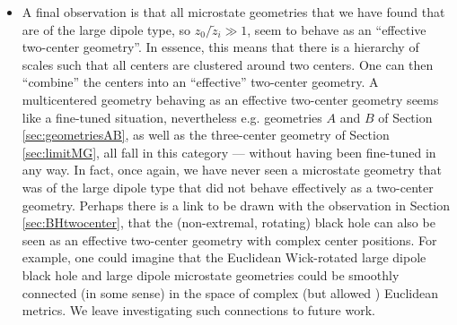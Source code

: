 \documentclass[12pt,a4paper]{article}
\begin{document}
\begin{itemize}
\item A final observation is that all microstate geometries that we have found that are of the large dipole type, so $z_0/\tilde z_i\gg 1$, seem to behave as an ``effective two-center geometry''. In essence, this means that there is a hierarchy of scales such that all centers are clustered around two centers. One can then  ``combine'' the centers into an ``effective'' two-center geometry. A multicentered geometry behaving as an effective two-center geometry seems like a fine-tuned situation, nevertheless e.g. geometries $A$ and $B$ of Section \ref{sec:geometriesAB}, as well as the three-center geometry of Section \ref{sec:limitMG}, all fall in this category --- without having been fine-tuned in any way. In fact, once again, we have never seen a microstate geometry that was of the large dipole type that did not behave effectively as a two-center geometry. Perhaps there is a link to be drawn with the observation in Section \ref{sec:BHtwocenter}, that the (non-extremal, rotating) black hole can also be seen as an effective two-center geometry with complex center positions. For example, one could imagine that the Euclidean Wick-rotated large dipole black hole and large dipole microstate geometries could be smoothly connected (in some sense) in the space of complex (but allowed \cite{Witten:2021nzp}) Euclidean metrics.
We leave investigating such connections to future work.

\end{itemize}



\end{document}

